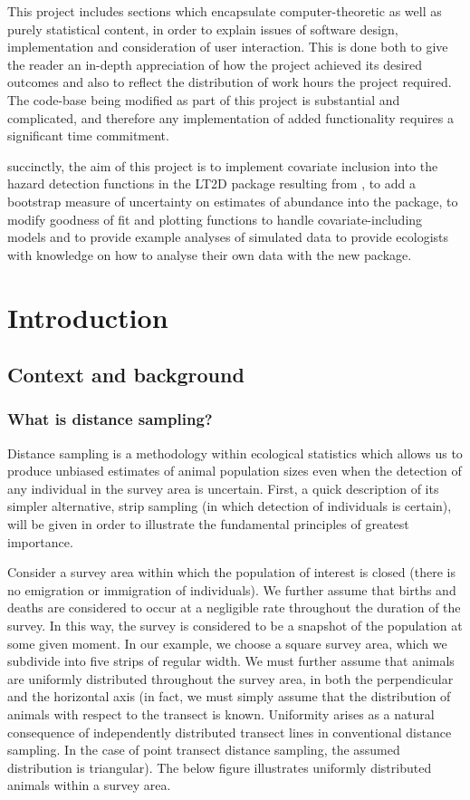 \documentclass[11pt]{article}
\begin{document}
\begin{multicols}{2}
This project includes sections which encapsulate computer-theoretic as well as purely statistical content, in order to explain issues of software design, implementation and consideration of user interaction. This is done both to give the reader an in-depth appreciation of how the project achieved its desired outcomes and also to reflect the distribution of work hours the project required. The code-base being modified as part of this project is substantial and complicated, and therefore any implementation of added functionality requires a significant time commitment.

succinctly, the aim of this project is to implement covariate inclusion into the hazard detection functions in the LT2D package resulting from \cite{Borchers}, to add a bootstrap measure of uncertainty on estimates of abundance into the package, to modify goodness of fit and plotting functions to handle covariate-including models and to provide example analyses of simulated data to provide ecologists with knowledge on how to analyse their own data with the new package.

\section{Introduction}
\subsection{Context and background}


\subsubsection{What is distance sampling?}

Distance sampling is a methodology within ecological statistics which allows us to produce unbiased estimates of animal population sizes even when the detection of any individual in the survey area is uncertain. First, a quick description of its simpler alternative, strip sampling (in which detection of individuals is certain), will be given in order to illustrate the fundamental principles of greatest importance. 

Consider a survey area within which the population of interest is closed (there is no emigration or immigration of individuals). We further assume that births and deaths are considered to occur at a negligible rate throughout the duration of the survey. In this way, the survey is considered to be a snapshot of the population at some given moment. In our example, we choose a square survey area, which we subdivide into five strips of regular width. We must further assume that animals are uniformly distributed throughout the survey area, in both the perpendicular and the horizontal axis (in fact, we must simply assume that the distribution of animals with respect to the transect is known. Uniformity arises as a natural consequence of independently distributed transect lines in conventional distance sampling. In the case of point transect distance sampling, the assumed distribution is triangular). The below figure illustrates uniformly distributed animals within a survey area.


\end{multicols}
\end{document}
